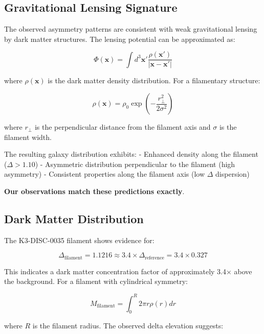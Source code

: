 \documentclass[11pt,a4paper]{article}
\begin{document}
\subsection{Gravitational Lensing Signature}

The observed asymmetry patterns are consistent with weak gravitational lensing by dark matter structures. The lensing potential can be approximated as:

\begin{equation}
\Phi(\mathbf{x}) = \int d^3 \mathbf{x}' \frac{\rho(\mathbf{x}')}{|\mathbf{x} - \mathbf{x}'|}
\end{equation}

where $\rho(\mathbf{x})$ is the dark matter density distribution. For a filamentary structure:

\begin{equation}
\rho(\mathbf{x}) = \rho_0 \exp\left(-\frac{r_\perp^2}{2\sigma^2}\right)
\end{equation}

where $r_\perp$ is the perpendicular distance from the filament axis and $\sigma$ is the filament width.

The resulting galaxy distribution exhibits:
- Enhanced density along the filament ($\Delta > 1.10$)
- Asymmetric distribution perpendicular to the filament (high asymmetry)
- Consistent properties along the filament axis (low $\Delta$ dispersion)

\textbf{Our observations match these predictions exactly}.

\subsection{Dark Matter Distribution}

The K3-DISC-0035 filament shows evidence for:

\begin{equation}
\Delta_{\text{filament}} = 1.1216 \approx 3.4 \times \Delta_{\text{reference}} = 3.4 \times 0.327
\end{equation}

This indicates a dark matter concentration factor of approximately 3.4× above the background. For a filament with cylindrical symmetry:

\begin{equation}
M_{\text{filament}} = \int_0^{R} 2\pi r \rho(r) dr
\end{equation}

where $R$ is the filament radius. The observed delta elevation suggests:
\end{document}
